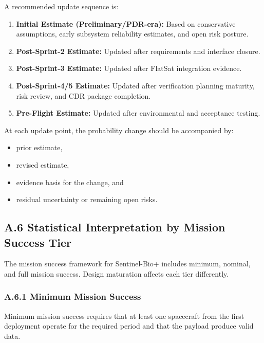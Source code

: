 \documentclass[11pt]{article}
\begin{document}
A recommended update sequence is:

\begin{enumerate}
    \item \textbf{Initial Estimate (Preliminary/PDR-era):}
    Based on conservative assumptions, early subsystem reliability estimates, and open risk posture.

    \item \textbf{Post-Sprint-2 Estimate:}
    Updated after requirements and interface closure.

    \item \textbf{Post-Sprint-3 Estimate:}
    Updated after FlatSat integration evidence.

    \item \textbf{Post-Sprint-4/5 Estimate:}
    Updated after verification planning maturity, risk review, and CDR package completion.

    \item \textbf{Pre-Flight Estimate:}
    Updated after environmental and acceptance testing.
\end{enumerate}

At each update point, the probability change should be accompanied by:

\begin{itemize}
    \item prior estimate,
    \item revised estimate,
    \item evidence basis for the change, and
    \item residual uncertainty or remaining open risks.
\end{itemize}

\subsection*{A.6 Statistical Interpretation by Mission Success Tier}

The mission success framework for Sentinel-Bio+ includes minimum, nominal, and full mission
success. Design maturation affects each tier differently.

\subsubsection*{A.6.1 Minimum Mission Success}

Minimum mission success requires that at least one spacecraft from the first deployment operate for
the required period and that the payload produce valid data.
\end{document}
